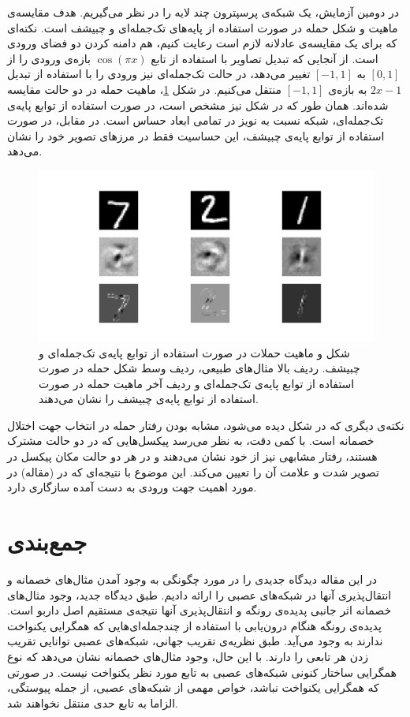 \documentclass[12pt,onecolumn,a4paper]{article}
\begin{document}
در دومین آزمایش، یک شبکه‌ی پرسپترون چند لایه را در نظر می‌گیریم. هدف مقایسه‌ی ماهیت و شکل حمله در صورت استفاده از پایه‌های تک‌جمله‌ای و چبیشف است. نکته‌ای که برای یک مقایسه‌ی عادلانه لازم است رعایت کنیم، هم دامنه کردن دو فضای ورودی است. از آنجایی که تبدیل تصاویر  با استفاده از تابع $\cos(\pi x)$ بازه‌ی ورودی را از $[0,1]$ به $[-1,1]$ تغییر می‌دهد، در حالت تک‌جمله‌ای نیز ورودی را با استفاده از تبدیل $2x-1$ به بازه‌ی $[-1,1]$ منتقل می‌کنیم. در شکل \ref{fig:shape}، ماهیت حمله در دو حالت مقایسه شده‌اند. همان طور که در شکل نیز مشخص است، در صورت استفاده از توابع پایه‌ی تک‌جمله‌ای، شبکه نسبت به نویز در تمامی ابعاد حساس است. در مقابل، در صورت استفاده از توابع پایه‌ی چبیشف، این حساسیت فقط در مرزهای تصویر خود را نشان می‌دهد.
\begin{figure}[t]
	\centering
	\includegraphics[width=\linewidth]{shapeshift.png}
	\caption{شکل و ماهیت حملات در صورت استفاده از توابع پایه‌ی تک‌جمله‌ای و چبیشف. ردیف بالا مثال‌های طبیعی، ردیف وسط شکل حمله در صورت استفاده از توابع پایه‌ی تک‌جمله‌ای و ردیف آخر ماهیت حمله در صورت استفاده از توابع پایه‌ی چبیشف را نشان می‌دهند.}
	\label{fig:shape}
\end{figure}

نکته‌ی دیگری که در شکل دیده می‌شود، مشابه بودن رفتار حمله در انتخاب جهت اختلال خصمانه است. با کمی دقت، به نظر می‌رسد پیکسل‌هایی که در دو حالت مشترک هستند، رفتار مشابهی نیز از خود نشان می‌دهند و در هر دو حالت مکان پیکسل در تصویر  شدت و علامت آن را تعیین می‌کند. این موضوع با نتیجه‌ای که در (مقاله) در مورد اهمیت جهت ورودی به دست آمده سازگاری دارد.

\section{جمع‌بندی}
در این مقاله دیدگاه جدیدی را در مورد چگونگی به وجود آمدن مثال‌های خصمانه و انتقال‌پذیری آنها در شبکه‌های عصبی را ارائه دادیم. طبق دیدگاه جدید، وجود مثال‌های خصمانه اثر جانبی پدیده‌ی رونگه و انتقال‌پذیری آنها نتیجه‌ی مستقیم اصل داربو است. پدیده‌ی رونگه هنگام درون‌یابی با استفاده از چندجمله‌ای‌هایی که همگرایی یکنواخت ندارند به وجود می‌آید. طبق نظریه‌ی تقریب جهانی، شبکه‌های عصبی توانایی تقریب زدن هر تابعی را دارند. با این حال، وجود مثال‌های خصمانه نشان می‌دهد که نوع همگرایی ساختار کنونی شبکه‌های عصبی به تابع مورد نظر یکنواخت نیست. در صورتی که همگرایی یکنواخت نباشد، خواص مهمی از شبکه‌های عصبی، از جمله پیوستگی، الزاما به تابع حدی منتقل نخواهند شد.
\end{document}
